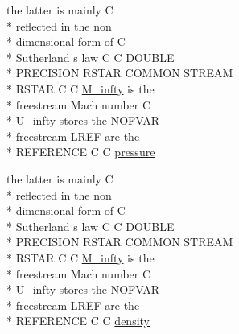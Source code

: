 \begin{DoxyCompactItemize}
\item 
the latter is mainly C \\*
reflected in the non \\*
dimensional form of C \\*
Sutherland s law C C D\-O\-U\-B\-L\-E \\*
P\-R\-E\-C\-I\-S\-I\-O\-N R\-S\-T\-A\-R C\-O\-M\-M\-O\-N S\-T\-R\-E\-A\-M \\*
R\-S\-T\-A\-R C C \hyperlink{msa20_2home_2abonfi_2_c_f_d__codes_2_eul_f_s_83_82_83_2include_2stream_8com_a57c765efd76d44669f6966962bda2d72}{M\-\_\-infty} is the \\*
freestream Mach number C \\*
\hyperlink{msa20_2home_2abonfi_2_c_f_d__codes_2_eul_f_s_83_82_83_2include_2stream_8com_a3306f725a42d6173548f0867aa4313ef}{U\-\_\-infty} stores the N\-O\-F\-V\-A\-R \\*
freestream \hyperlink{msa20_2home_2abonfi_2_c_f_d__codes_2_eul_f_s_83_82_83_2include_2stream_8com_a19d492a15feda819ed49e580c6a1568f}{L\-R\-E\-F} \hyperlink{msa20_2home_2abonfi_2_c_f_d__codes_2_eul_f_s_83_82_83_2include_2ibc8_8com_a7f7721a0bb3c1d35cfbfbcfd6efc1548}{are} the \\*
R\-E\-F\-E\-R\-E\-N\-C\-E C C \hyperlink{msa20_2home_2abonfi_2_c_f_d__codes_2_eul_f_s_83_82_83_2include_2stream_8com_a0facbcffae9f2ce2b94119850b5fc3d3}{pressure}
\item 
the latter is mainly C \\*
reflected in the non \\*
dimensional form of C \\*
Sutherland s law C C D\-O\-U\-B\-L\-E \\*
P\-R\-E\-C\-I\-S\-I\-O\-N R\-S\-T\-A\-R C\-O\-M\-M\-O\-N S\-T\-R\-E\-A\-M \\*
R\-S\-T\-A\-R C C \hyperlink{msa20_2home_2abonfi_2_c_f_d__codes_2_eul_f_s_83_82_83_2include_2stream_8com_a57c765efd76d44669f6966962bda2d72}{M\-\_\-infty} is the \\*
freestream Mach number C \\*
\hyperlink{msa20_2home_2abonfi_2_c_f_d__codes_2_eul_f_s_83_82_83_2include_2stream_8com_a3306f725a42d6173548f0867aa4313ef}{U\-\_\-infty} stores the N\-O\-F\-V\-A\-R \\*
freestream \hyperlink{msa20_2home_2abonfi_2_c_f_d__codes_2_eul_f_s_83_82_83_2include_2stream_8com_a19d492a15feda819ed49e580c6a1568f}{L\-R\-E\-F} \hyperlink{msa20_2home_2abonfi_2_c_f_d__codes_2_eul_f_s_83_82_83_2include_2ibc8_8com_a7f7721a0bb3c1d35cfbfbcfd6efc1548}{are} the \\*
R\-E\-F\-E\-R\-E\-N\-C\-E C C \hyperlink{msa20_2home_2abonfi_2_c_f_d__codes_2_eul_f_s_83_82_83_2include_2stream_8com_ae3461cde09d7d40d4800995573999b7e}{density}
\end{DoxyCompactItemize}


